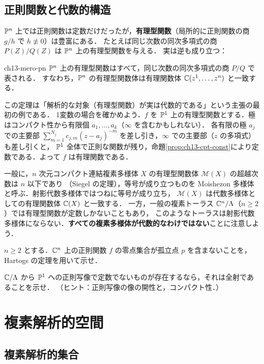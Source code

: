 \subsection{正則関数と代数的構造}

$\mathbb{P}^n$ 上では正則関数は定数だけだったが，\textbf{有理型関数}（局所的に正則関数の商 $g/h$ で $h\not\equiv0$）は豊富にある．
たとえば同じ次数の同次多項式の商 $P(Z)/Q(Z)$ は $\mathbb{P}^n$ 上の有理型関数を与える．
実は逆も成り立つ：

\begin{mythm}{}{ch13-mero-pn}
$\mathbb{P}^n$ 上の有理型関数はすべて，同じ次数の同次多項式の商 $P/Q$ で表される．
すなわち，$\mathbb{P}^n$ の有理型関数体は有理関数体 $\mathbb{C}(z^1,\dots,z^n)$ と一致する．
\end{mythm}

この定理は「解析的な対象（有理型関数）が実は代数的である」という主張の最初の例である．
1変数の場合を確かめよう．$f$ を $\mathbb{P}^1$ 上の有理型関数とする．極はコンパクト性から有限個 $a_1,\dots,a_k$（$\infty$ を含むかもしれない）．
各有限の極 $a_j$ での主要部 $\sum_{m=1}^{N_j}c_{j,m}(z-a_j)^{-m}$ を差し引き，$\infty$ での主要部（$z$ の多項式）も差し引くと，
$\mathbb{P}^1$ 全体で正則な関数が残り，命題\ref{prop:ch13-cpt-const}により定数である．よって $f$ は有理関数である．

一般に，$n$ 次元コンパクト連結複素多様体 $X$ の有理型関数体 $\mathcal{M}(X)$ の超越次数は $n$ 以下であり
（Siegel の定理），等号が成り立つものを Moishezon 多様体と呼ぶ．射影代数多様体ではつねに等号が成り立ち，
$\mathcal{M}(X)$ は代数多様体としての有理関数体 $\mathbb{C}(X)$ と一致する．
一方，一般の複素トーラス $\mathbb{C}^n/\Lambda$（$n\geq2$）では有理型関数が定数しかないこともあり，
このようなトーラスは射影代数多様体にならない．\textbf{すべての複素多様体が代数的なわけではない}ことに注意しよう．

$n\geq2$ とする．$\mathbb{C}^n$ 上の正則関数 $f$ の零点集合が孤立点 $p$ を含まないことを，Hartogs の定理を用いて示せ．

$\mathbb{C}/\Lambda$ から $\mathbb{P}^1$ への正則写像で定数でないものが存在するなら，それは全射であることを示せ．
（ヒント：正則写像の像の開性と，コンパクト性．）

\section{複素解析的空間}

\subsection{複素解析的集合}

